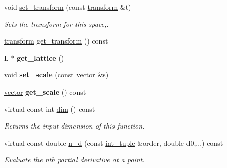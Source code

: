 \begin{DoxyCompactItemize}
void \hyperlink{classsisl_1_1si__function_adaac36945118aaededcba9344f5be1ce}{set\+\_\+transform} (const \hyperlink{namespacesisl_a2ef12d285ca3e626c05abbdec1f8a679}{transform} \&t)
\begin{DoxyCompactList}\small\item\em Sets the transform for this space,. \end{DoxyCompactList}\item 
\hyperlink{namespacesisl_a2ef12d285ca3e626c05abbdec1f8a679}{transform} \hyperlink{classsisl_1_1si__function_a8e173df1adf445d4939f142846186364}{get\+\_\+transform} () const
\item 
\mbox{\label{classsisl_1_1si__function_a717b4abb8666f883a5fd215ad356bfaf}} 
L $\ast$ {\bfseries get\+\_\+lattice} ()
\item 
\mbox{\label{classsisl_1_1si__function_afa07c7ced6a5c1342e043b0f4a1faadf}} 
void {\bfseries set\+\_\+scale} (const \hyperlink{namespacesisl_a2069bd5374a9be042ff3ce3306d41e1a}{vector} \&s)
\item 
\mbox{\label{classsisl_1_1si__function_a79b73f1edbff36dfd4f7f085b99a7e51}} 
\hyperlink{namespacesisl_a2069bd5374a9be042ff3ce3306d41e1a}{vector} {\bfseries get\+\_\+scale} () const
\item 
\mbox{\label{classsisl_1_1si__function_aa61607a58135682c4c03062e4e77844c}} 
virtual const int \hyperlink{classsisl_1_1si__function_aa61607a58135682c4c03062e4e77844c}{dim} () const
\begin{DoxyCompactList}\small\item\em Returns the input dimension of this function. \end{DoxyCompactList}\item 
\mbox{\label{classsisl_1_1si__function_ad437132577e852410ecac53f0cab6bde}} 
virtual const double \hyperlink{classsisl_1_1si__function_ad437132577e852410ecac53f0cab6bde}{n\+\_\+d} (const \hyperlink{namespacesisl_adc492e1c166a136d08b283394d81cd71}{int\+\_\+tuple} \&order, double d0,...) const
\begin{DoxyCompactList}\small\item\em Evaluate the n\textquotesingle{}th partial derivative at a point. \end{DoxyCompactList}\item 

\end{DoxyCompactItemize}
